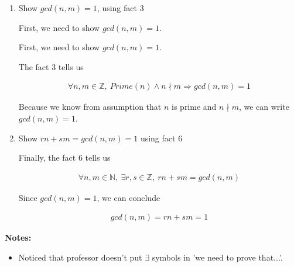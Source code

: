 \documentclass[12pt]{article}
\begin{document}
\begin{enumerate}[a.]
\begin{mdframed}
    \bigskip

    \begin{enumerate}[1.]
        \item Show $gcd(n,m) = 1$, using fact 3

        \bigskip

        First, we need to show $gcd(n,m) = 1$.

        \bigskip

        \begin{mdframed}
        First, we need to show $gcd(n,m) = 1$.

        \bigskip

        The fact 3 tells us

        \begin{align}
            \forall n,m \in \mathbb{Z},\:Prime(n) \land n \nmid m \Rightarrow gcd(n,m) = 1
        \end{align}

        \bigskip

        Because we know from assumption that $n$ is prime and $n \nmid m$, we can write
        $gcd(n,m) = 1$.
        \end{mdframed}

        \item Show $rn + sm = gcd(n,m) = 1$ using fact 6

        \bigskip

        \begin{mdframed}
        Finally, the fact 6 tells us

        \begin{align}
            \forall n,m \in \mathbb{N},\:\exists r,s \in \mathbb{Z},\:rn + sm = gcd(n,m)
        \end{align}

        \bigskip

        Since $gcd(n,m) = 1$, we can conclude

        \begin{align}
            gcd(n,m) = rn + sm  = 1
        \end{align}
        \end{mdframed}

    \end{enumerate}

    \end{mdframed}

    \bigskip

    \textbf{Notes:}

    \begin{itemize}
        \item Noticed that professor doesn't put $\exists$ symbols in 'we need to prove that...'.


\end{itemize}
\end{enumerate}
\end{document}

